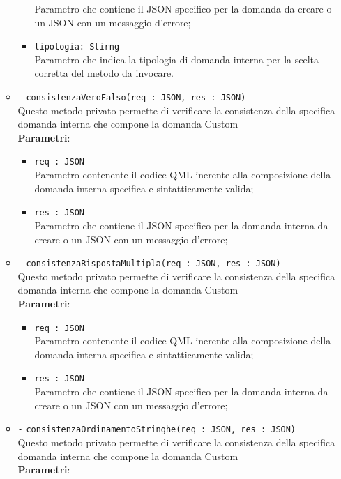 \begin{itemize}
\begin{itemize}
\begin{itemize}
			Parametro che contiene il JSON specifico per la domanda da creare o un JSON con un messaggio d'errore;
			\item \texttt{tipologia: Stirng} \\
			Parametro che indica la tipologia di domanda interna per la scelta corretta del metodo da invocare.
		\end{itemize}
		\item \texttt{-} \texttt{consistenzaVeroFalso(req : JSON, res : JSON)} \\
		Questo metodo privato permette di verificare la consistenza della specifica domanda interna che compone la domanda Custom \\
		\textbf{Parametri}:
		\begin{itemize}
			\item \texttt{req : JSON} \\
			Parametro contenente il codice QML inerente alla composizione della domanda interna specifica e sintatticamente valida;
			\item \texttt{res : JSON} \\
			Parametro che contiene il JSON specifico per la domanda interna da creare o un JSON con un messaggio d'errore;
		\end{itemize}
		\item \texttt{-} \texttt{consistenzaRispostaMultipla(req : JSON, res : JSON)} \\
		Questo metodo privato permette di verificare la consistenza della specifica domanda interna che compone la domanda Custom \\
		\textbf{Parametri}:
		\begin{itemize}
			\item \texttt{req : JSON} \\
			Parametro contenente il codice QML inerente alla composizione della domanda interna specifica e sintatticamente valida;
			\item \texttt{res : JSON} \\
			Parametro che contiene il JSON specifico per la domanda interna da creare o un JSON con un messaggio d'errore;
		\end{itemize}
		\item \texttt{-} \texttt{consistenzaOrdinamentoStringhe(req : JSON, res : JSON)} \\
		Questo metodo privato permette di verificare la consistenza della specifica domanda interna che compone la domanda Custom \\
		\textbf{Parametri}:
		\begin{itemize}

\end{itemize}
\end{itemize}
\end{itemize}
